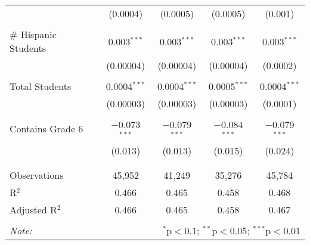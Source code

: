 \begin{table}[!htbp]
\begin{tabular}{@{\extracolsep{-2pt}}lcccc}
  & (0.0004) & (0.0005) & (0.0005) & (0.001) \\ 
  & & & & \\ 
 \# Hispanic Students & 0.003$^{***}$ & 0.003$^{***}$ & 0.003$^{***}$ & 0.003$^{***}$ \\ 
  & (0.00004) & (0.00004) & (0.00004) & (0.0002) \\ 
  & & & & \\ 
 Total Students & 0.0004$^{***}$ & 0.0004$^{***}$ & 0.0005$^{***}$ & 0.0004$^{***}$ \\ 
  & (0.00003) & (0.00003) & (0.00003) & (0.0001) \\ 
  & & & & \\ 
 Contains Grade 6 & $-$0.073$^{***}$ & $-$0.079$^{***}$ & $-$0.084$^{***}$ & $-$0.079$^{***}$ \\ 
  & (0.013) & (0.013) & (0.015) & (0.024) \\ 
  & & & & \\ 
\hline \\[-1.8ex] 
Observations & 45,952 & 41,249 & 35,276 & 45,784 \\ 
R$^{2}$ & 0.466 & 0.465 & 0.458 & 0.468 \\ 
Adjusted R$^{2}$ & 0.466 & 0.465 & 0.458 & 0.467 \\ 
\hline 
\hline \\[-1.8ex] 
\textit{Note:}  & \multicolumn{4}{r}{$^{*}$p$<$0.1; $^{**}$p$<$0.05; $^{***}$p$<$0.01} \\ 
\end{tabular} 
\end{table} 

